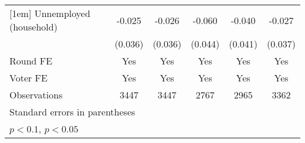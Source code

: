 \begin{table}[htbp]
\begin{tabular}{l*{5}{c}}
[1em]
Unnemployed (household)&      -0.025       &      -0.026       &      -0.060       &      -0.040       &      -0.027       \\
                    &     (0.036)       &     (0.036)       &     (0.044)       &     (0.041)       &     (0.037)       \\
[1em]
\hline  Round FE    &         Yes       &         Yes       &         Yes       &         Yes       &         Yes       \\
[1em]
Voter FE            &         Yes       &         Yes       &         Yes       &         Yes       &         Yes       \\
\hline
Observations        &        3447       &        3447       &        2767       &        2965       &        3362       \\
\hline\hline
\multicolumn{6}{l}{\footnotesize Standard errors in parentheses}\\
\multicolumn{6}{l}{\footnotesize \sym{+} \(p<0.1\), \sym{*} \(p<0.05\)}\\
\end{tabular}
\end{table}
